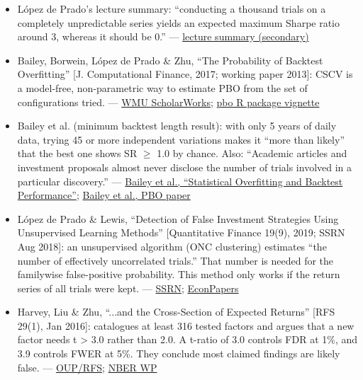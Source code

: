 \documentclass{article}
\begin{document}
\begin{itemize}
\item López de Prado's lecture summary: ``conducting a thousand trials on a completely unpredictable series yields an expected maximum Sharpe ratio around 3, whereas it should be 0.'' --- \href{https://fluentnumbers.medium.com/the-reasons-most-ml-quant-funds-fail-human-generated-summary-of-marcos-lopez-de-prado-lecture-e7d6bd95ef50}{lecture summary (secondary)}

\item Bailey, Borwein, López de Prado \& Zhu, ``The Probability of Backtest Overfitting'' [J. Computational Finance, 2017; working paper 2013]: CSCV is a model-free, non-parametric way to estimate PBO from the set of configurations tried. --- \href{https://scholarworks.wmich.edu/math_pubs/42/}{WMU ScholarWorks}; \href{https://cran.r-project.org/web/packages/pbo/vignettes/pbo.html}{pbo R package vignette}

\item Bailey et al. (minimum backtest length result): with only 5 years of daily data, trying 45 or more independent variations makes it ``more than likely'' that the best one shows SR \ensuremath{\geq} 1.0 by chance. Also: ``Academic articles and investment proposals almost never disclose the number of trials involved in a particular discovery.'' --- \href{https://sdm.lbl.gov/oapapers/ssrn-id2507040-bailey.pdf}{Bailey et al., ``Statistical Overfitting and Backtest Performance''}; \href{https://www.davidhbailey.com/dhbpapers/backtest-prob.pdf}{Bailey et al., PBO paper}

\item López de Prado \& Lewis, ``Detection of False Investment Strategies Using Unsupervised Learning Methods'' [Quantitative Finance 19(9), 2019; SSRN Aug 2018]: an unsupervised algorithm (ONC clustering) estimates ``the number of effectively uncorrelated trials.'' That number is needed for the familywise false-positive probability. This method only works if the return series of all trials were kept. --- \href{https://papers.ssrn.com/sol3/papers.cfm?abstract_id=3167017}{SSRN}; \href{https://econpapers.repec.org/article/tafquantf/v_3a19_3ay_3a2019_3ai_3a9_3ap_3a1555-1565.htm}{EconPapers}

\item Harvey, Liu \& Zhu, ``...and the Cross-Section of Expected Returns'' [RFS 29(1), Jan 2016]: catalogues at least 316 tested factors and argues that a new factor needs t > 3.0 rather than 2.0. A t-ratio of 3.0 controls FDR at 1\%, and 3.9 controls FWER at 5\%. They conclude most claimed findings are likely false. --- \href{https://academic.oup.com/rfs/article/29/1/5/1843824}{OUP/\allowbreak{}RFS}; \href{https://www.nber.org/system/files/working_papers/w20592/w20592.pdf}{NBER WP}


\end{itemize}
\end{document}
